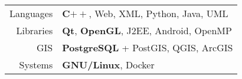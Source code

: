
\begin{tabu} to 
  Languages & \textbf{C$++$}, Web, XML, Python, Java, UML\\
  Libraries & \textbf{Qt}, \textbf{OpenGL}, J2EE, Android, OpenMP\\
  GIS & \textbf{PostgreSQL} + PostGIS, QGIS, ArcGIS\\
  Systems & \textbf{GNU/Linux}, Docker
\end{tabu}

